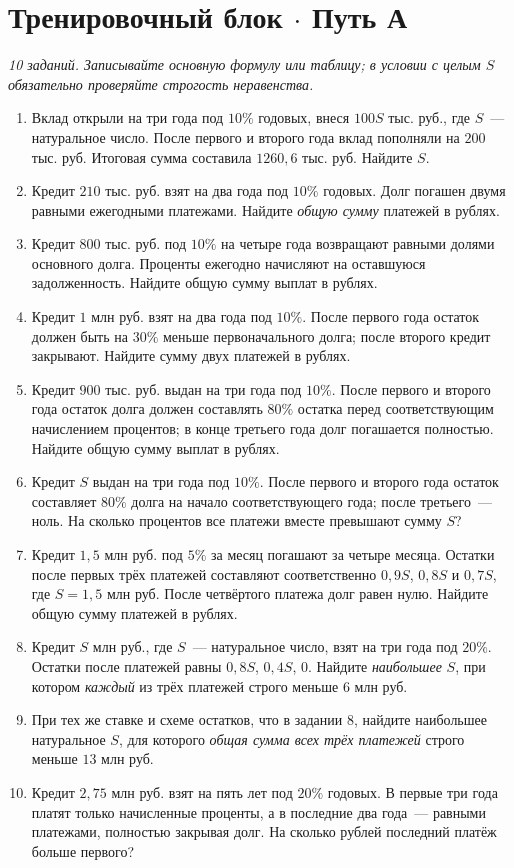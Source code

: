\documentclass[a4paper,12pt]{article}
\newcommand{\lessonhead}[1]{\section*{\color{darkaccent}#1}}
\begin{document}
\clearpage
\lessonhead{Тренировочный блок \texorpdfstring{\(\cdot\)}{} Путь А}
\textit{10 заданий. Записывайте основную формулу или таблицу; в условии с целым \(S\) обязательно проверяйте строгость неравенства.}
\begingroup
{}
\begin{enumerate}[label=\textbf{\arabic*.},itemsep=5pt]
\item Вклад открыли на три года под \(10\%\) годовых, внеся \(100S\) тыс. руб., где \(S\)~--- натуральное число. После первого и второго года вклад пополняли на \(200\) тыс. руб. Итоговая сумма составила \(1260{,}6\) тыс. руб. Найдите \(S\).
\item Кредит \(210\) тыс. руб. взят на два года под \(10\%\) годовых. Долг погашен двумя равными ежегодными платежами. Найдите \emph{общую сумму} платежей в рублях.
\item Кредит \(800\) тыс. руб. под \(10\%\) на четыре года возвращают равными долями основного долга. Проценты ежегодно начисляют на оставшуюся задолженность. Найдите общую сумму выплат в рублях.
\item Кредит \(1\) млн руб. взят на два года под \(10\%\). После первого года остаток должен быть на \(30\%\) меньше первоначального долга; после второго кредит закрывают. Найдите сумму двух платежей в рублях.
\item Кредит \(900\) тыс. руб. выдан на три года под \(10\%\). После первого и второго года остаток долга должен составлять \(80\%\) остатка перед соответствующим начислением процентов; в конце третьего года долг погашается полностью. Найдите общую сумму выплат в рублях.
\item Кредит \(S\) выдан на три года под \(10\%\). После первого и второго года остаток составляет \(80\%\) долга на начало соответствующего года; после третьего~--- ноль. На сколько процентов все платежи вместе превышают сумму \(S\)?
\item Кредит \(1{,}5\) млн руб. под \(5\%\) за месяц погашают за четыре месяца. Остатки после первых трёх платежей составляют соответственно \(0{,}9S\), \(0{,}8S\) и \(0{,}7S\), где \(S=1{,}5\) млн руб. После четвёртого платежа долг равен нулю. Найдите общую сумму платежей в рублях.
\item Кредит \(S\) млн руб., где \(S\)~--- натуральное число, взят на три года под \(20\%\). Остатки после платежей равны \(0{,}8S\), \(0{,}4S\), \(0\). Найдите \emph{наибольшее} \(S\), при котором \emph{каждый} из трёх платежей строго меньше \(6\) млн руб.
\item При тех же ставке и схеме остатков, что в задании 8, найдите наибольшее натуральное \(S\), для которого \emph{общая сумма всех трёх платежей} строго меньше \(13\) млн руб.
\item Кредит \(2{,}75\) млн руб. взят на пять лет под \(20\%\) годовых. В первые три года платят только начисленные проценты, а в последние два года~--- равными платежами, полностью закрывая долг. На сколько рублей последний платёж больше первого?
\end{enumerate}
\endgroup
\end{document}
